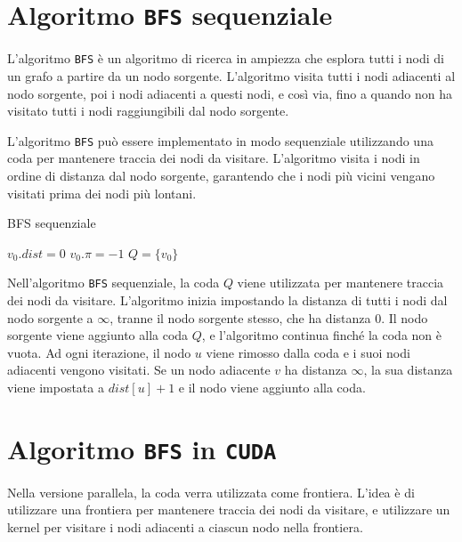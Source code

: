 \section{Algoritmo \texttt{BFS} sequenziale}
L'algoritmo \texttt{BFS} è un algoritmo di ricerca in ampiezza
che esplora tutti i nodi di un grafo a partire da un nodo sorgente.
L'algoritmo visita tutti i nodi adiacenti al nodo sorgente, poi
i nodi adiacenti a questi nodi, e così via, fino a quando non
ha visitato tutti i nodi raggiungibili dal nodo sorgente.

L'algoritmo \texttt{BFS} può essere implementato in modo sequenziale
utilizzando una coda per mantenere traccia dei nodi da visitare.
L'algoritmo visita i nodi in ordine di distanza dal nodo sorgente,
garantendo che i nodi più vicini vengano visitati prima dei nodi
più lontani.

\begin{algorithm}[H]
  \caption{BFS sequenziale}
  \( v_0.dist = 0 \)\;
  \( v_0.\pi = -1 \)\;
  \( Q = \{v_0\} \)\;
\end{algorithm}

Nell'algoritmo \texttt{BFS} sequenziale, la coda \(Q\) viene utilizzata
per mantenere traccia dei nodi da visitare. L'algoritmo inizia impostando
la distanza di tutti i nodi dal nodo sorgente a \(\infty\), tranne il
nodo sorgente stesso, che ha distanza \(0\). Il nodo sorgente viene
aggiunto alla coda \(Q\), e l'algoritmo continua finché la coda non è
vuota. Ad ogni iterazione, il nodo \(u\) viene rimosso dalla coda e
i suoi nodi adiacenti vengono visitati. Se un nodo adiacente \(v\) ha
distanza \(\infty\), la sua distanza viene impostata a \(dist[u] + 1\)
e il nodo viene aggiunto alla coda.

\section{Algoritmo \texttt{BFS} in \texttt{CUDA}}
Nella versione parallela, la coda verra utilizzata come 
frontiera.
L'idea è di utilizzare una frontiera per mantenere traccia
dei nodi da visitare, e utilizzare un kernel per visitare
i nodi adiacenti a ciascun nodo nella frontiera.

